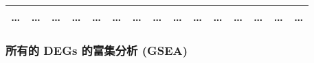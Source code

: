 \documentclass[
]{article}
\begin{document}
\begin{longtable}[]{@{}lllllllllllllll@{}}
\begin{minipage}[t]{0.05\columnwidth}
\ldots{}\strut
\end{minipage} & \begin{minipage}[t]{0.05\columnwidth}\raggedright
\ldots{}\strut
\end{minipage} & \begin{minipage}[t]{0.04\columnwidth}\raggedright
\ldots{}\strut
\end{minipage} & \begin{minipage}[t]{0.02\columnwidth}\raggedright
\ldots{}\strut
\end{minipage} & \begin{minipage}[t]{0.05\columnwidth}\raggedright
\ldots{}\strut
\end{minipage} & \begin{minipage}[t]{0.05\columnwidth}\raggedright
\ldots{}\strut
\end{minipage} & \begin{minipage}[t]{0.05\columnwidth}\raggedright
\ldots{}\strut
\end{minipage} & \begin{minipage}[t]{0.05\columnwidth}\raggedright
\ldots{}\strut
\end{minipage} & \begin{minipage}[t]{0.05\columnwidth}\raggedright
\ldots{}\strut
\end{minipage} & \begin{minipage}[t]{0.05\columnwidth}\raggedright
\ldots{}\strut
\end{minipage} & \begin{minipage}[t]{0.05\columnwidth}\raggedright
\ldots{}\strut
\end{minipage} & \begin{minipage}[t]{0.05\columnwidth}\raggedright
\ldots{}\strut
\end{minipage} & \begin{minipage}[t]{0.05\columnwidth}\raggedright
\ldots{}\strut
\end{minipage} & \begin{minipage}[t]{0.05\columnwidth}\raggedright
\ldots{}\strut
\end{minipage} & \begin{minipage}[t]{0.02\columnwidth}\raggedright
\ldots{}\strut
\end{minipage}\tabularnewline
\bottomrule
\end{longtable}

\hypertarget{ux6240ux6709ux7684-degs-ux7684ux5bccux96c6ux5206ux6790-gsea}{%
\subsubsection{所有的 DEGs 的富集分析 (GSEA)}\label{ux6240ux6709ux7684-degs-ux7684ux5bccux96c6ux5206ux6790-gsea}}
\end{document}
